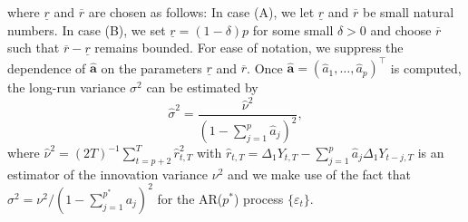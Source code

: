 where $\underline{r}$ and $\overline{r}$ are chosen as follows: In case (A), we let $\underline{r}$ and $\overline{r}$ be small natural numbers. In case (B), we set $\underline{r} = (1-\delta) p$ for some small $\delta > 0$ and choose $\overline{r}$ such that $\overline{r} - \underline{r}$ remains bounded. For ease of notation, we suppress the dependence of $\widehat{\boldsymbol{a}}$ on the parameters $\underline{r}$ and $\overline{r}$. Once $\widehat{\boldsymbol{a}} =(\widehat{a}_1,\ldots,\widehat{a}_p)^\top$ is computed, the long-run variance $\sigma^2$ can be estimated by 
\begin{equation} \label{est-lrv}
\widehat{\sigma}^2 = \frac{\widehat{\nu}^2}{(1 - \sum_{j=1}^p \widehat{a}_j)^2}, 
\end{equation}
where $\widehat{\nu}^2 = (2T)^{-1} \sum_{t=p+2}^T \widehat{r}_{t,T}^2$ with $\widehat{r}_{t,T} = \Delta_1 Y_{t,T} - \sum_{j=1}^p \widehat{a}_j \Delta_1 Y_{t-j,T}$ is an estimator of the innovation variance $\nu^2$ and we make use of the fact that $\sigma^2 = \nu^2 / (1 - \sum_{j=1}^{p^*} a_j)^2$ for the AR($p^*$) process $\{\varepsilon_t\}$. 


